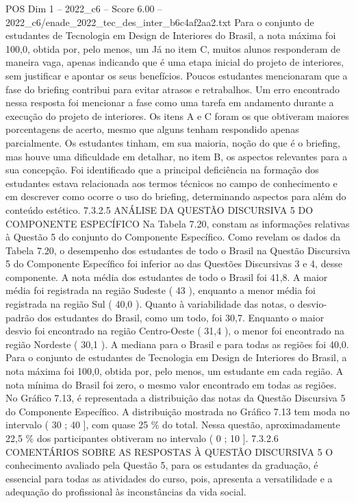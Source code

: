 \begin{textsample}{POS Dim 1 – 2022\_c6 – Score 6.00 – 2022\_c6/enade\_2022\_tec\_des\_inter\_b6c4af2aa2.txt}
Para o conjunto de estudantes de Tecnologia em Design de Interiores do Brasil, a nota máxima foi 100,0, obtida por, pelo menos, um Já no item C, muitos alunos responderam de maneira vaga, apenas indicando que é uma etapa inicial do projeto de interiores, sem justificar e apontar os seus benefícios.
Poucos estudantes mencionaram que a fase do briefing contribui para evitar atrasos e retrabalhos.
Um erro encontrado nessa resposta foi mencionar a fase como uma tarefa em andamento durante a execução do projeto de interiores.
Os itens A e C foram os que obtiveram maiores porcentagens de acerto, mesmo que alguns tenham respondido apenas parcialmente.
Os estudantes tinham, em sua maioria, noção do que é o briefing, mas houve uma dificuldade em detalhar, no item B, os aspectos relevantes para a sua concepção.
Foi identificado que a principal deficiência na formação dos estudantes estava relacionada aos termos técnicos no campo de conhecimento e em descrever como ocorre o uso do briefing, determinando aspectos para além do conteúdo estético. 7.3.2.5 ANÁLISE DA QUESTÃO DISCURSIVA 5 DO COMPONENTE ESPECÍFICO Na Tabela 7.20, constam as informações relativas à Questão 5 do conjunto do Componente Específico.
Como revelam os dados da Tabela 7.20, o desempenho dos estudantes de todo o Brasil na Questão Discursiva 5 do Componente Específico foi inferior ao das Questões Discursivas 3 e 4, desse componente.
A nota média dos estudantes de todo o Brasil foi 41,8.
A maior média foi registrada na região Sudeste ( 43 ), enquanto a menor média foi registrada na região Sul ( 40,0 ).
Quanto à variabilidade das notas, o desvio-padrão dos estudantes do Brasil, como um todo, foi 30,7.
Enquanto o maior desvio foi encontrado na região Centro-Oeste ( 31,4 ), o menor foi encontrado na região Nordeste ( 30,1 ).
A mediana para o Brasil e para todas as regiões foi 40,0.
Para o conjunto de estudantes de Tecnologia em Design de Interiores do Brasil, a nota máxima foi 100,0, obtida por, pelo menos, um estudante em cada região.
A nota mínima do Brasil foi zero, o mesmo valor encontrado em todas as regiões.
No Gráfico 7.13, é representada a distribuição das notas da Questão Discursiva 5 do Componente Específico.
A distribuição mostrada no Gráfico 7.13 tem moda no intervalo ( 30 ; 40 ], com quase 25 \% do total.
Nessa questão, aproximadamente 22,5 \% dos participantes obtiveram no intervalo ( 0 ; 10 ]. 7.3.2.6 COMENTÁRIOS SOBRE AS RESPOSTAS À QUESTÃO DISCURSIVA 5 O conhecimento avaliado pela Questão 5, para os estudantes da graduação, é essencial para todas as atividades do curso, pois, apresenta a versatilidade e a adequação do profissional às inconstâncias da vida social.

\end{textsample}
